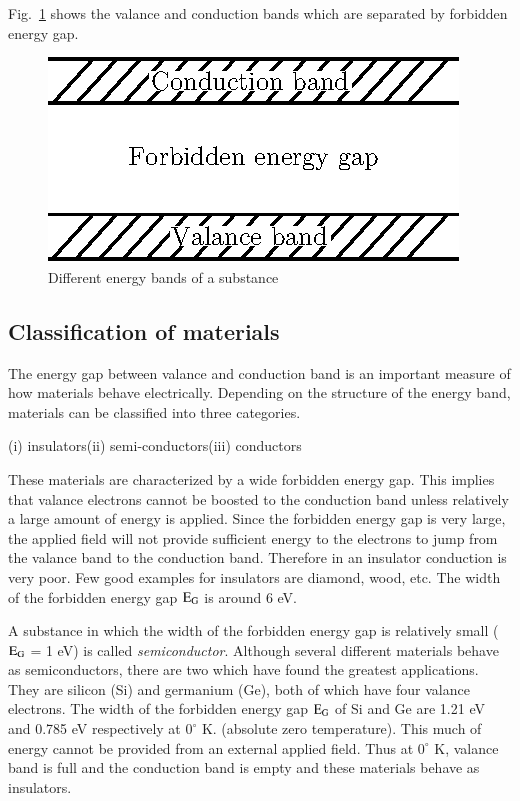 Fig.~\ref{fig1.2} shows the valance and conduction bands which are separated by forbidden energy gap.
\begin{figure}[H]
\centering
\includegraphics{chap1/fig1.2.eps}
\caption{Different energy bands of a substance}\label{fig1.2}
\end{figure}

\subsection{Classification of materials}\label{sec1.1.1}

The energy gap between valance and conduction band is an important measure of how materials behave electrically. Depending on the structure of the energy band, materials can be classified into three categories.

(i) insulators\qquad (ii) semi-conductors\qquad (iii) conductors

 These materials are characterized by a wide forbidden energy gap. This implies that valance electrons cannot be boosted to the conduction band unless relatively a large amount of energy is applied. Since the forbidden energy gap is very large, the applied field will not provide sufficient energy to the electrons to jump from the valance band to the conduction band. Therefore in an insulator conduction is very poor. Few good examples for insulators are diamond, wood, etc. The width of the forbidden energy gap $\textrm{E}_{\textrm{G}}$ is around 6 eV.

 A substance in which the width of the forbidden energy gap is relatively small ($\textrm{E}_{\textrm{G}}$ = 1 eV) is called {\em semiconductor}. Although several different materials behave as semiconductors, there are two which have found the greatest applications. They are silicon (Si) and germanium (Ge), both of which have four valance electrons. The width of the forbidden energy gap $\textrm{E}_{\textrm{G}}$ of Si and Ge are 1.21 eV and 0.785 eV respectively at $0^{\circ}$ K. (absolute zero temperature). This much of energy cannot be provided from an external applied field. Thus at $0^{\circ}$ K, valance band is full and the conduction band is empty and these materials behave as insulators.

